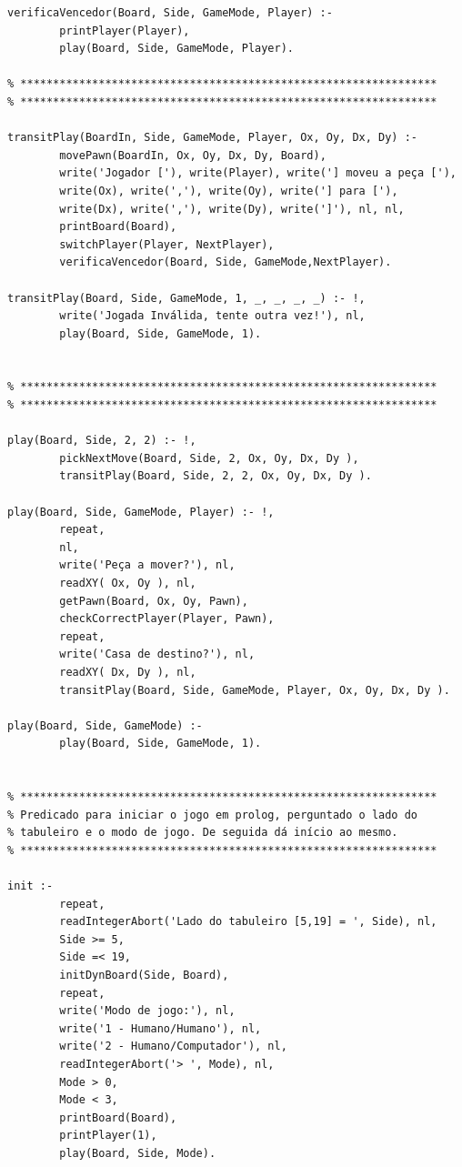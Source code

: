 \documentclass[15pt,a4paper]{article}
\begin{document}
\begin{lstlisting}
verificaVencedor(Board, Side, GameMode, Player) :-
		printPlayer(Player),
		play(Board, Side, GameMode, Player).
	
% ****************************************************************
% ****************************************************************

transitPlay(BoardIn, Side, GameMode, Player, Ox, Oy, Dx, Dy) :-
		movePawn(BoardIn, Ox, Oy, Dx, Dy, Board),
		write('Jogador ['), write(Player), write('] moveu a peça ['),
		write(Ox), write(','), write(Oy), write('] para ['),
		write(Dx), write(','), write(Dy), write(']'), nl, nl,
		printBoard(Board),
		switchPlayer(Player, NextPlayer),
		verificaVencedor(Board, Side, GameMode,NextPlayer).

transitPlay(Board, Side, GameMode, 1, _, _, _, _) :- !,
		write('Jogada Inválida, tente outra vez!'), nl,
		play(Board, Side, GameMode, 1).


% ****************************************************************
% ****************************************************************

play(Board, Side, 2, 2) :- !,
		pickNextMove(Board, Side, 2, Ox, Oy, Dx, Dy ),
		transitPlay(Board, Side, 2, 2, Ox, Oy, Dx, Dy ).

play(Board, Side, GameMode, Player) :- !,
		repeat,
		nl,
		write('Peça a mover?'), nl,
		readXY( Ox, Oy ), nl,
		getPawn(Board, Ox, Oy, Pawn),
		checkCorrectPlayer(Player, Pawn),
		repeat,
		write('Casa de destino?'), nl,	
		readXY( Dx, Dy ), nl,
		transitPlay(Board, Side, GameMode, Player, Ox, Oy, Dx, Dy ).
	
play(Board, Side, GameMode) :-
		play(Board, Side, GameMode, 1).


% ****************************************************************
% Predicado para iniciar o jogo em prolog, perguntado o lado do
% tabuleiro e o modo de jogo. De seguida dá início ao mesmo.
% ****************************************************************
	
init :-
		repeat,
		readIntegerAbort('Lado do tabuleiro [5,19] = ', Side), nl,
		Side >= 5,
		Side =< 19,
		initDynBoard(Side, Board),
		repeat,
		write('Modo de jogo:'), nl,
		write('1 - Humano/Humano'), nl,
		write('2 - Humano/Computador'), nl,
		readIntegerAbort('> ', Mode), nl,
		Mode > 0,
		Mode < 3,
		printBoard(Board),
		printPlayer(1),
		play(Board, Side, Mode).

\end{lstlisting}
\end{document}

